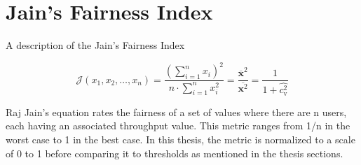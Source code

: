 
\chapter{Jain's Fairness Index} %

\label{AppendixA} %


A description of the Jain's Fairness Index

\begin{equation}
    \mathcal{J}\left(x_{1}, x_{2}, \ldots, x_{n}\right)=\frac{\left(\sum_{i=1}^{n} x_{i}\right)^{2}}{n \cdot \sum_{i=1}^{n} x_{i}^{2}}=\frac{\overline{\mathbf{x}}^{2}}{\overline{\mathbf{x}^{2}}}=\frac{1}{1+\widehat{c_{\mathrm{v}}^{2}}}
    \end{equation}

    Raj Jain's equation rates the fairness of a set of values where there are n users, each having an associated
    throughput value. This metric ranges from 1/n in the worst case to 1 in the best case.
    \newline
    In this thesis, the metric is normalized to a scale of 0 to 1 before comparing it to thresholds as mentioned in
    the thesis sections.